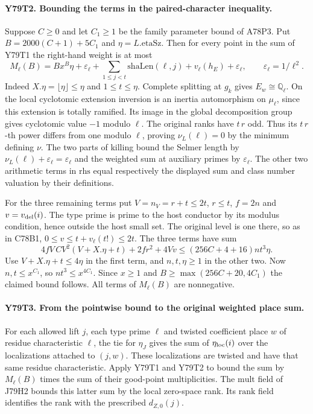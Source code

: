 \paragraph{Y79T2. Bounding the terms in the paired-character inequality.}
Suppose $C\ge0$ and let $C_1\ge1$ be the family parameter bound of
A78P3. Put $B=2000(C+1)+5C_1$ and $\eta=L.\mathrm{etaSz}$. Then
for every point in the sum of Y79T1 the right-hand weight is at most
\[
 M_\ell(B)=B x^B\eta+\varepsilon_\ell+
           \sum_{1\le j<t}\mathrm{shaLen}(\ell,j)
            +v_\ell(h_E)+\varepsilon_\ell,
 \qquad \varepsilon_\ell=1/\ell^2 .
\]
Indeed $X.\eta=\lfloor\eta\rfloor\le\eta$ and $1\le t\le\eta$.
Complete splitting at $g_k$ gives $E_w\cong\mathbb Q_\ell$.
On the local cyclotomic extension inversion is an inertia automorphism
on $\mu_\ell$, since this extension is totally ramified. Its image in
the global decomposition group gives cyclotomic value $-1$ modulo
$\ell$. The original ranks have $t\,r$ odd. Thus its $t\,r$-th power
differs from one modulo $\ell$, proving $\nu_L(\ell)=0$ by the
minimum defining $\nu$. The two parts of killing bound the Selmer
length by $\nu_L(\ell)+\varepsilon_\ell=\varepsilon_\ell$ and
the weighted sum at auxiliary primes by $\varepsilon_\ell$.
The other two arithmetic terms in $\mathrm{rhs}$ equal respectively
the displayed sum and class number valuation by their definitions.

For the three remaining terms put $V=n_V=r+t\le2t$, $r\le t$,
$f=2n$ and $v=v_{\rm del}(i)$. The type prime is prime to the host
conductor by its modulus condition, hence outside the host small
set. The original level is one there, so as in C78B1,
$0\le v\le t+v_\ell(t!)\le2t$.
The three terms have sum
\[
 4fV\, C V^2(V+X.\eta+t)+2fr^2+4Vv
       \le (256C+4+16)nt^3\eta .
\]
Use $V+X.\eta+t\le4\eta$ in the first term, and $n,t,\eta\ge1$
in the other two. Now $n,t\le x^{C_1}$, so $nt^3\le x^{4C_1}$.
Since $x\ge1$ and $B\ge\max(256C+20,4C_1)$ the claimed
bound follows. All terms of $M_\ell(B)$ are nonnegative.

\paragraph{Y79T3. From the pointwise bound to the original weighted place sum.}
For each allowed lift $j$, each type prime $\ell$ and twisted
coefficient place $w$ of residue characteristic $\ell$, the tie for
$\eta_J$ gives the sum of $\eta_{\rm loc}(i)$ over the localizations
attached to $(j,w)$. These localizations are twisted and have that same
residue characteristic. Apply Y79T1 and Y79T2 to bound the sum by
$M_\ell(B)$ times the sum of their good-point multiplicities.
The $\mathrm{mult}$ field of J79H2 bounds this latter sum by the
local zero-space rank. Its $\mathrm{rank}$ field identifies the rank
with the prescribed $d_{Z,0}(j)$.

